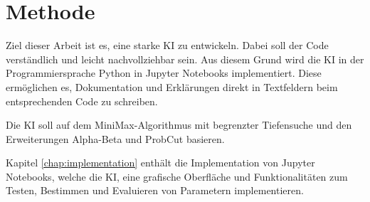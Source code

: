 
\chapter{Methode}
\label{chap:methode}

Ziel dieser Arbeit ist es, eine starke KI zu entwickeln. Dabei soll der Code verständlich und leicht nachvollziehbar
sein. Aus diesem Grund wird die KI in der Programmiersprache Python in Jupyter Notebooks implementiert. Diese
ermöglichen es, Dokumentation und Erklärungen direkt in Textfeldern beim entsprechenden Code zu schreiben.

Die KI soll auf dem MiniMax-Algorithmus mit begrenzter Tiefensuche und den Erweiterungen Alpha-Beta und ProbCut
basieren.

Kapitel \ref{chap:implementation} enthält die Implementation von Jupyter Notebooks, welche die KI, eine grafische Oberfläche und Funktionalitäten zum Testen, Bestimmen und Evaluieren von Parametern implementieren.
